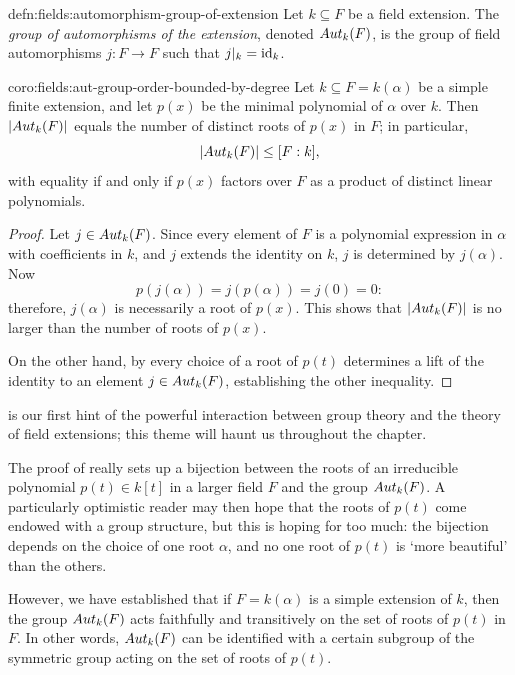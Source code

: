\begin{defn}{}{defn:fields:automorphism-group-of-extension}
  Let $k \subseteq F$ be a field extension. The \emph{group of
    automorphisms of the extension}, denoted $Aut_k(F)$, is the group
  of field automorphisms $j : F \to F$ such that $j|_k = \operatorname{id}_k$.
\end{defn}

\begin{coro}{}{coro:fields:aut-group-order-bounded-by-degree}
  Let $k \subseteq F = k(\alpha)$ be a simple finite extension, and
  let $p(x)$ be the minimal polynomial of $\alpha$ over $k$. Then
  $|Aut_k(F)|$ equals the number of distinct roots of $p(x)$ in $F$;
  in particular,
  \[|Aut_k(F)| \leq [F : k],\] with equality if and only if $p(x)$
  factors over $F$ as a product of distinct linear polynomials.
\end{coro}

\begin{proof}
  Let $j \in Aut_k(F)$. Since every element of $F$ is a polynomial
  expression in $\alpha$ with coefficients in $k$, and $j$ extends the
  identity on $k$, $j$ is determined by $j(\alpha)$. Now
  \[p(j(\alpha)) = j(p(\alpha)) = j(0) = 0:\] therefore, $j(\alpha)$
  is necessarily a root of $p(x)$. This shows that $|Aut_k(F)|$ is no
  larger than the number of roots of $p(x)$.

  On the other hand, by  every choice of a root
  of $p(t)$ determines a lift of the identity to an element
  $j \in Aut_k(F)$, establishing the other inequality.
\end{proof}
 is our first hint of the powerful interaction
between group theory and the theory of field extensions; this theme
will haunt us throughout the chapter.

The proof of  really sets up a bijection between
the roots of an irreducible polynomial $p(t) \in k[t]$ in a larger
field $F$ and the group $Aut_k(F)$. A particularly optimistic reader
may then hope that the roots of $p(t)$ come endowed with a group
structure, but this is hoping for too much: the bijection depends on
the choice of one root $\alpha$, and no one root of $p(t)$ is `more
beautiful' than the others.

However, we have established that if $F = k(\alpha)$ is a simple
extension of $k$, then the group $Aut_k(F)$ acts faithfully and
transitively on the set of roots of $p(t)$ in $F$. In other words,
$Aut_k(F)$ can be identified with a certain subgroup of the symmetric
group acting on the set of roots of $p(t)$.

